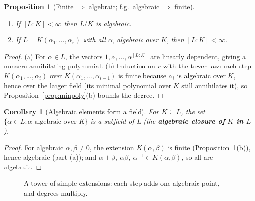 \documentclass[11pt,a4paper]{article}
\newtheorem{proposition}[theorem]{Proposition}
\newtheorem{corollary}[theorem]{Corollary}
\theoremstyle{definition}
\newcommand{\Q}{\mathbb{Q}}
\begin{document}
\begin{proposition}[Finite $\Rightarrow$ algebraic; f.g.\ algebraic $\Rightarrow$ finite]\label{prop:fin-alg}
\begin{enumerate}[label=(\alph*)]
  \item If $[L:K]<\infty$ then $L/K$ is algebraic.
  \item If $L=K(\alpha_1,\dots,\alpha_r)$ with all $\alpha_i$ algebraic over $K$, then $[L:K]<\infty$.
\end{enumerate}
\end{proposition}
\begin{proof}
(a) For $\alpha\in L$, the vectors $1,\alpha,\dots,\alpha^{[L:K]}$ are linearly dependent, giving a
nonzero annihilating polynomial. (b) Induction on $r$ with the tower law: each step
$K(\alpha_1,\dots,\alpha_i)$ over $K(\alpha_1,\dots,\alpha_{i-1})$ is finite because $\alpha_i$ is
algebraic over $K$, hence over the larger field (its minimal polynomial over $K$ still annihilates
it), so Proposition~\ref{prop:minpoly}(b) bounds the degree.
\end{proof}

\begin{corollary}[Algebraic elements form a field]\label{cor:alg-closure-in-L}
For $K\subseteq L$, the set $\{\alpha\in L:\alpha\text{ algebraic over }K\}$ is a subfield of $L$
(the \textbf{algebraic closure of $K$ in $L$}).
\end{corollary}
\begin{proof}
For algebraic $\alpha,\beta\neq0$, the extension $K(\alpha,\beta)$ is finite
(Proposition~\ref{prop:fin-alg}(b)), hence algebraic (part (a)); and
$\alpha\pm\beta,\ \alpha\beta,\ \alpha^{-1}\in K(\alpha,\beta)$, so all are algebraic.
\end{proof}

\begin{figure}[h]
\centering
{}
\caption{A tower of simple extensions: each step adds one algebraic point, and degrees multiply.}
\end{figure}
\end{document}
